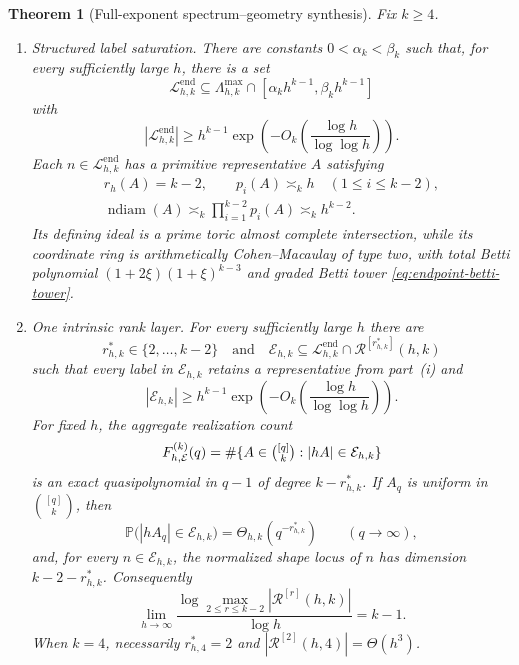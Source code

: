 \documentclass[11pt,reqno]{amsart}
\newtheorem{theorem}{Theorem}[section]
\theoremstyle{definition}
\theoremstyle{remark}
\newcommand{\Rcal}{\mathcal R}
\newcommand{\ndiam}{\operatorname{ndiam}}
\begin{document}
\begin{theorem}[Full-exponent spectrum--geometry synthesis]
\label{thm:maximal-rank-saturation}
Fix $k\geq4$.
\begin{enumerate}[label=\textup{(\roman*)}]
\item \emph{Structured label saturation.}
There are constants \(0<\alpha_k<\beta_k\) such that, for every sufficiently
large $h$, there is a set
\[
 \mathcal L^{\mathrm{end}}_{h,k}\subseteq
 \Lambda^{\max}_{h,k}\cap[\alpha_kh^{k-1},\beta_kh^{k-1}]
\]
with
\begin{equation}\label{eq:maximal-rank-label-saturation}
 |\mathcal L^{\mathrm{end}}_{h,k}|
 \geq h^{k-1}
 \exp\!\left(-O_k\!\left(\frac{\log h}{\log\log h}\right)\right).
\end{equation}
Each $n\in\mathcal L^{\mathrm{end}}_{h,k}$ has a primitive representative
$A$ satisfying
\[
 \begin{gathered}
  r_h(A)=k-2,\qquad
  p_i(A)\asymp_k h\quad(1\leq i\leq k-2),\\
  \ndiam(A)\asymp_k\prod_{i=1}^{k-2}p_i(A)\asymp_k h^{k-2}.
 \end{gathered}
\]
Its defining ideal is a prime toric almost complete intersection, while its
coordinate ring is arithmetically Cohen--Macaulay of type two, with total
Betti polynomial $(1+2\xi)(1+\xi)^{k-3}$ and graded Betti tower
\eqref{eq:endpoint-betti-tower}.

\item \emph{One intrinsic rank layer.}
For every sufficiently large $h$ there are
\[
 r^\ast_{h,k}\in\{2,\ldots,k-2\}
 \quad\text{and}\quad
 \mathcal E_{h,k}\subseteq
 \mathcal L^{\mathrm{end}}_{h,k}\cap\Rcal^{[r^\ast_{h,k}]}(h,k)
\]
such that every label in $\mathcal E_{h,k}$ retains a representative from
part~\textup{(i)} and
\begin{equation}\label{eq:dominant-rank-layer-count}
 |\mathcal E_{h,k}|\geq h^{k-1}
 \exp\!\left(-O_k\!\left(\frac{\log h}{\log\log h}\right)\right).
\end{equation}
For fixed $h$, the aggregate realization count
\[
 F^{(k)}_{h,\mathcal E}(q)
 =\#\{A\in\tbinom{[q]}k:|hA|\in\mathcal E_{h,k}\}
\]
is an exact quasipolynomial in $q-1$ of degree $k-r^\ast_{h,k}$.  If $A_q$
is uniform in $\binom{[q]}k$, then
\begin{equation}\label{eq:dominant-rank-layer-rarity}
 \mathbb P\bigl(|hA_q|\in\mathcal E_{h,k}\bigr)
 =\Theta_{h,k}(q^{-r^\ast_{h,k}})
 \qquad(q\to\infty),
\end{equation}
and, for every $n\in\mathcal E_{h,k}$, the normalized shape locus of $n$
has dimension $k-2-r^\ast_{h,k}$.
Consequently
\begin{equation}\label{eq:dominant-intrinsic-rank-exponent}
 \lim_{h\to\infty}
 \frac{\log\max_{2\leq r\leq k-2}|\Rcal^{[r]}(h,k)|}{\log h}=k-1.
\end{equation}
When $k=4$, necessarily $r^\ast_{h,4}=2$ and
$|\Rcal^{[2]}(h,4)|=\Theta(h^3)$.

\end{enumerate}
\end{theorem}
\end{document}
